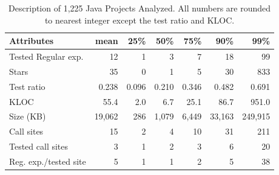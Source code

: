 
\begin{table}[tb]
\caption{Description of 1,225 Java Projects Analyzed. All numbers are rounded to nearest integer except the test ratio and KLOC.}
\label{regex:distriprojects}
\vspace{-6pt}
\begin{small}
\begin{tabular}{p{2.4cm}@{}r r r r r r}
\hline
Attributes & mean & 25\% & 50\% & 75\% & 90\% & 99\%  \\
\hline
Tested Regular exp. & 12 & 1    & 3     & 7    & 18   & 99 \\
Stars& 35 & 0 & 1 & 5 & 30 & 833 \\
Test ratio & 0.238 & 0.096 & 0.210 & 0.346 & 0.482 & 0.691\\ 
KLOC & 55.4 & 2.0 & 6.7 & 25.1 & 86.7 & 951.0 \\ 
Size (KB) & 19,062 & 286 & 1,079 & 6,449 & 33,163 & 249,915 \\ 
\hline
\hline
Call sites 		  & 15 & 2 & 4 & 10 & 31 & 211 \\
Tested call sites & 3 & 1 & 2 & 3 & 6 & 20 \\
Reg. exp./tested site & 5 & 1 & 1 & 2 & 5 & 38 \\
\hline
\end{tabular}
\end{small}
\vspace{-6pt}
\end{table}




